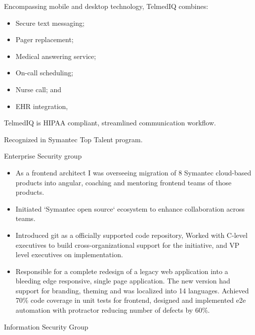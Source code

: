 \documentclass[11pt,a4paper,roman]{moderncv}       %
\begin{document}
Encompassing mobile and desktop technology, TelmedIQ combines:
\begin{itemize}
    \item Secure text messaging;
    \item Pager replacement;
    \item Medical answering service;
    \item On-call scheduling;
    \item Nurse call; and
    \item EHR integration, 
\end{itemize}

TelmedIQ is HIPAA compliant, streamlined communication workflow.



\vspace{16pt}


Recognized in Symantec Top Talent program.

\vspace{6pt}

Enterprise Security group
\begin{itemize}
    \item As a frontend architect I was overseeing migration of 8 Symantec cloud-based products into angular, coaching and mentoring frontend teams of those products. 
    \item Initiated `Symantec open source` ecosystem to enhance collaboration across teams. 
    \item Introduced git as a officially supported code repository, Worked with C-level executives to build cross-organizational support for the initiative, and VP level executives on implementation.
    \item Responsible for a complete redesign of a legacy web application into a bleeding edge responsive, single page application. The new version had support for branding, theming and was localized into 14 languages. Achieved 70\% code coverage in unit tests for frontend, designed and implemented e2e automation with protractor reducing number of defects by 60\%.
\end{itemize}

\vspace{6pt}

Information Security Group
\end{document}
